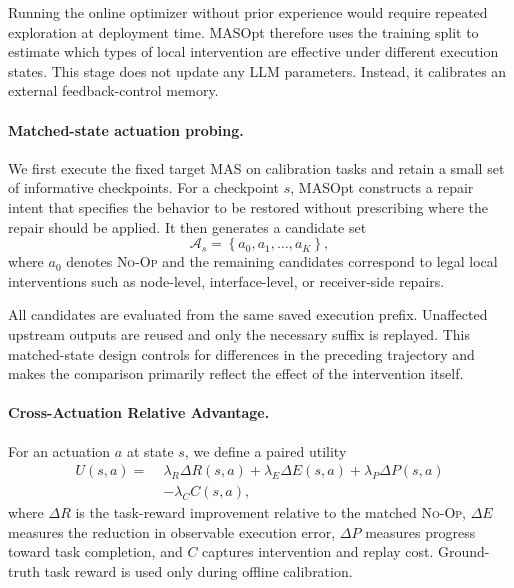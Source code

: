Running the online optimizer without prior experience would require repeated exploration at deployment time.
MASOpt therefore uses the training split to estimate which types of local intervention are effective under different execution states.
This stage does not update any LLM parameters.
Instead, it calibrates an external feedback-control memory.

\paragraph{\textbf{Matched-state actuation probing.}}
We first execute the fixed target MAS on calibration tasks and retain a small set of informative checkpoints.
For a checkpoint $s$, MASOpt constructs a repair intent that specifies the behavior to be restored without prescribing where the repair should be applied.
It then generates a candidate set
\begin{equation}
    \mathcal{A}_s =
    \left\{
        a_0,a_1,\ldots,a_K
    \right\},
\end{equation}
where $a_0$ denotes \textsc{No-Op} and the remaining candidates correspond to legal local interventions such as node-level, interface-level, or receiver-side repairs.

All candidates are evaluated from the same saved execution prefix.
Unaffected upstream outputs are reused and only the necessary suffix is replayed.
This matched-state design controls for differences in the preceding trajectory and makes the comparison primarily reflect the effect of the intervention itself.

\paragraph{\textbf{Cross-Actuation Relative Advantage.}}
For an actuation $a$ at state $s$, we define a paired utility
\begin{equation}
\begin{split}
    U(s,a)
    =\;&
    \lambda_R \Delta R(s,a)
    +
    \lambda_E \Delta E(s,a)
    +
    \lambda_P \Delta P(s,a) \\
    &-
    \lambda_C C(s,a),
\end{split}
\label{eq:utility}
\end{equation}
where $\Delta R$ is the task-reward improvement relative to the matched \textsc{No-Op}, $\Delta E$ measures the reduction in observable execution error, $\Delta P$ measures progress toward task completion, and $C$ captures intervention and replay cost.
Ground-truth task reward is used only during offline calibration.

